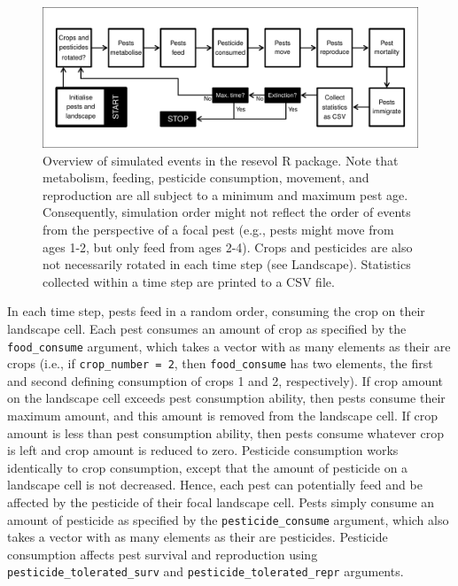 \documentclass[
]{article}
\begin{document}
\begin{figure}
\centering
\includegraphics{ms_files/figure-latex/flowchart-1.pdf}
\caption{\label{fig:flowchart}Overview of simulated events in the resevol R package. Note that metabolism, feeding, pesticide consumption, movement, and reproduction are all subject to a minimum and maximum pest age. Consequently, simulation order might not reflect the order of events from the perspective of a focal pest (e.g., pests might move from ages 1-2, but only feed from ages 2-4). Crops and pesticides are also not necessarily rotated in each time step (see Landscape). Statistics collected within a time step are printed to a CSV file.}
\end{figure}

In each time step, pests feed in a random order, consuming the crop on their landscape cell. Each pest consumes an amount of crop as specified by the \texttt{food\_consume} argument, which takes a vector with as many elements as their are crops (i.e., if \texttt{crop\_number\ =\ 2}, then \texttt{food\_consume} has two elements, the first and second defining consumption of crops 1 and 2, respectively).
If crop amount on the landscape cell exceeds pest consumption ability, then pests consume their maximum amount, and this amount is removed from the landscape cell.
If crop amount is less than pest consumption ability, then pests consume whatever crop is left and crop amount is reduced to zero.
Pesticide consumption works identically to crop consumption, except that the amount of pesticide on a landscape cell is not decreased.
Hence, each pest can potentially feed and be affected by the pesticide of their focal landscape cell.
Pests simply consume an amount of pesticide as specified by the \texttt{pesticide\_consume} argument, which also takes a vector with as many elements as their are pesticides.
Pesticide consumption affects pest survival and reproduction using \texttt{pesticide\_tolerated\_surv} and \texttt{pesticide\_tolerated\_repr} arguments.
\end{document}
